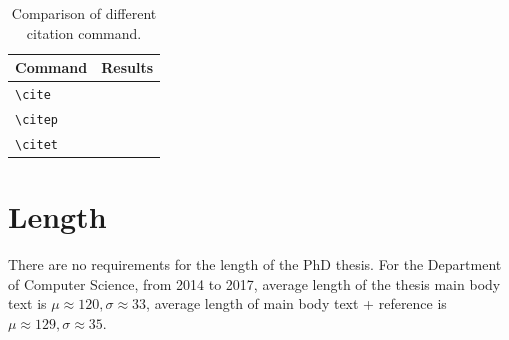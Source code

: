 \begin{table}
    \centering
    \caption[Short title]{Comparison of different citation command.}\label{tab:citation}
    \begin{tabular}{ll}
        \toprule
Command                        & Results \\ \midrule
\texttt{\textbackslash{}cite}  & \cite{LFR}\\
\texttt{\textbackslash{}citep} & \citep{LFR}\\
\texttt{\textbackslash{}citet} & \citet{LFR}\\\bottomrule
    \end{tabular}
\end{table}

\section{Length}
There are no requirements for the length of the PhD thesis. For the Department of Computer Science, from 2014 to 2017, average length of the thesis main body text is $\mu \approx 120, \sigma \approx 33$, average length of main body text + reference is $\mu \approx 129, \sigma \approx 35$.